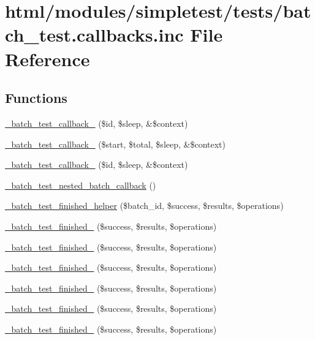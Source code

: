 \hypertarget{batch__test_8callbacks_8inc}{
\section{html/modules/simpletest/tests/batch\_\-test.callbacks.inc File Reference}
\label{batch__test_8callbacks_8inc}
}
\subsection*{Functions}
\begin{DoxyCompactItemize}
\item 
\hyperlink{batch__test_8callbacks_8inc_a06d8112c2b65db5cdb252f9f998593fd}{\_\-batch\_\-test\_\-callback\_} (\$id, \$sleep, \&\$context)
\item 
\hyperlink{batch__test_8callbacks_8inc_a4115acbe5e2f47b8e730491b50e02bfa}{\_\-batch\_\-test\_\-callback\_} (\$start, \$total, \$sleep, \&\$context)
\item 
\hyperlink{batch__test_8callbacks_8inc_ac396fb40be0f490431f4bcd459135218}{\_\-batch\_\-test\_\-callback\_} (\$id, \$sleep, \&\$context)
\item 
\hyperlink{batch__test_8callbacks_8inc_ab459d5bba304e2cc2efc37b125b1d97a}{\_\-batch\_\-test\_\-nested\_\-batch\_\-callback} ()
\item 
\hyperlink{batch__test_8callbacks_8inc_a46f274aa08ec4ba2ebc49e444c075cf2}{\_\-batch\_\-test\_\-finished\_\-helper} (\$batch\_\-id, \$success, \$results, \$operations)
\item 
\hyperlink{batch__test_8callbacks_8inc_a5c176c8078f4fad0d4760bbeaefcd3ef}{\_\-batch\_\-test\_\-finished\_} (\$success, \$results, \$operations)
\item 
\hyperlink{batch__test_8callbacks_8inc_a109ed818cc4141d389d3b5502520f52a}{\_\-batch\_\-test\_\-finished\_} (\$success, \$results, \$operations)
\item 
\hyperlink{batch__test_8callbacks_8inc_af3dee29f3d0ab709cdcc873292568dc3}{\_\-batch\_\-test\_\-finished\_} (\$success, \$results, \$operations)
\item 
\hyperlink{batch__test_8callbacks_8inc_ad4f60f4d44dfb1e22c8095a9b257be13}{\_\-batch\_\-test\_\-finished\_} (\$success, \$results, \$operations)
\item 
\hyperlink{batch__test_8callbacks_8inc_aec528f5d3b93f250ef9ed51c450989e9}{\_\-batch\_\-test\_\-finished\_} (\$success, \$results, \$operations)
\item 
\hyperlink{batch__test_8callbacks_8inc_a5a8ba83637ae5e76d03690b558ed4c84}{\_\-batch\_\-test\_\-finished\_} (\$success, \$results, \$operations)
\end{DoxyCompactItemize}


